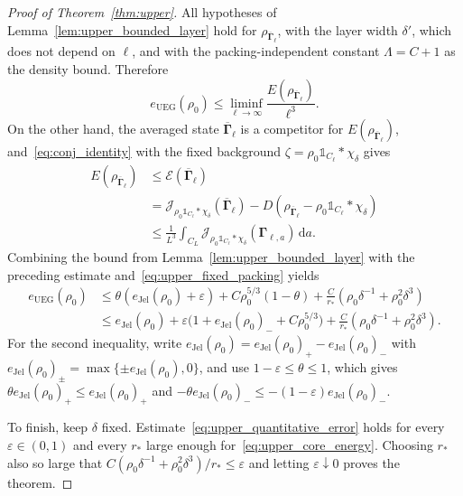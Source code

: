 \documentclass[final,reqno]{amsart}
\theoremstyle{remark}
\theoremstyle{definition}
\renewcommand{\le}{\leqslant}
\newcommand{\iden}{\mathbb{1}}
\newcommand{\EC}{\mathcal{E}}
\newcommand{\UEG}{\mathrm{UEG}}
\newcommand{\Jel}{\mathrm{Jel}}
\newcommand{\vGamma}{{\bm{\Gamma}}}
\begin{document}
\begin{proof}[Proof of Theorem~\ref{thm:upper}]
All hypotheses of Lemma~\ref{lem:upper_bounded_layer} hold for $\rho_{\overline{\vGamma}_\ell}$, with the layer width $\delta'$, which does not depend on $\ell$, and with the packing-independent constant $\Lambda=C+1$ as the density bound. Therefore
\[
e_\UEG(\rho_0)
\le\liminf_{\ell\to\infty}\frac{E(\rho_{\overline{\vGamma}_\ell})}{\ell^3}.
\]
On the other hand, the averaged state $\overline{\vGamma}_\ell$ is a competitor for $E(\rho_{\overline{\vGamma}_\ell})$, and~\eqref{eq:conj_identity} with the fixed background $\zeta=\rho_0\iden_{C_\ell}*\chi_\delta$ gives
\begin{align*}
E(\rho_{\overline{\vGamma}_\ell})
&\le\EC(\overline{\vGamma}_\ell)\\
&=\mathcal J_{\rho_0\iden_{C_\ell}*\chi_\delta}(\overline{\vGamma}_\ell)
-D(\rho_{\overline{\vGamma}_\ell}-\rho_0\iden_{C_\ell}*\chi_\delta)\\
&\le\frac1{L^3}\int_{C_L}\mathcal J_{\rho_0\iden_{C_\ell}*\chi_\delta}(\vGamma_{\ell,a})\,\mathrm da.
\end{align*}
Combining the bound from Lemma~\ref{lem:upper_bounded_layer} with the preceding estimate and~\eqref{eq:upper_fixed_packing} yields
\begin{equation}\label{eq:upper_quantitative_error}
\begin{aligned}
e_\UEG(\rho_0)
&\le\theta(e_\Jel(\rho_0)+\varepsilon)+C\rho_0^{5/3}(1-\theta)+\frac{C}{r_*}\left(\rho_0\delta^{-1}+\rho_0^2\delta^3\right)\\
&\le e_\Jel(\rho_0)+
\varepsilon\bigl(1+e_\Jel(\rho_0)_-+C\rho_0^{5/3}\bigr)
+\frac{C}{r_*}\left(\rho_0\delta^{-1}+\rho_0^2\delta^3\right).
\end{aligned}
\end{equation}
For the second inequality, write $e_\Jel(\rho_0)=e_\Jel(\rho_0)_+-e_\Jel(\rho_0)_-$ with $e_\Jel(\rho_0)_\pm=\max\{\pm e_\Jel(\rho_0),0\}$, and use $1-\varepsilon\le\theta\le1$, which gives $\theta e_\Jel(\rho_0)_+\le e_\Jel(\rho_0)_+$ and $-\theta e_\Jel(\rho_0)_-\le-(1-\varepsilon)e_\Jel(\rho_0)_-$.

To finish, keep $\delta$ fixed. Estimate~\eqref{eq:upper_quantitative_error} holds for every $\varepsilon\in(0,1)$ and every $r_*$ large enough for~\eqref{eq:upper_core_energy}. Choosing $r_*$ also so large that $C(\rho_0\delta^{-1}+\rho_0^2\delta^3)/r_*\le\varepsilon$ and letting $\varepsilon\downarrow0$ proves the theorem.
\end{proof}

\appendix

\end{document}
